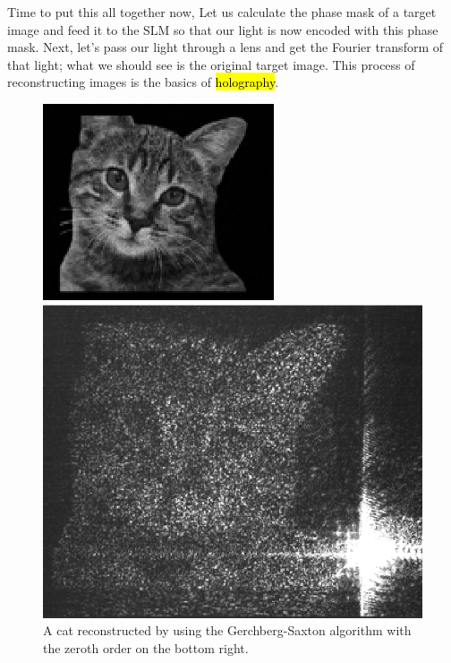 \documentclass{article}
\begin{document}
Time to put this all together now,
Let us calculate the phase mask of a target image and feed it to the SLM so that our light is now encoded with this phase mask.
Next, let's pass our light through a lens and get the Fourier transform of that light; what we should see is the original target image. This process of reconstructing images is the basics of \hl{holography}.
\begin{figure}[!phbt]
\begin{minipage}{0.45\linewidth}
    \centering
    \includegraphics[width=\linewidth]{img/cat1.eps}
\end{minipage}\hfil
\begin{minipage}{0.45\linewidth}
    \centering
    \includegraphics[width=\linewidth]{img/cat2.eps}
\end{minipage}
\caption{A cat reconstructed by using the Gerchberg-Saxton algorithm with the zeroth order on the bottom right.}
\label{fig:catrecon}
\end{figure}
\end{document}
